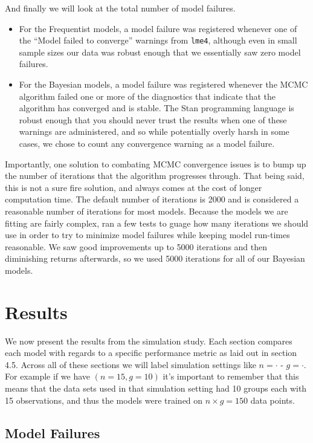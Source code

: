 \documentclass[12pt,twoside]{reedthesis}
\providecommand{\tightlist}{%
  \setlength{\itemsep}{0pt}\setlength{\parskip}{0pt}}
\begin{document}
And finally we will look at the total number of model failures.
\begin{itemize}
\tightlist
\item
  For the Frequentist models, a model failure was registered whenever one of the ``Model failed to converge'' warnings from \texttt{lme4}, although even in small sample sizes our data was robust enough that we essentially saw zero model failures.
\item
  For the Bayesian models, a model failure was registered whenever the MCMC algorithm failed one or more of the diagnostics that indicate that the algorithm has converged and is stable. The Stan programming language is robust enough that you should never trust the results when one of these warnings are administered, and so while potentially overly harsh in some cases, we chose to count any convergence warning as a model failure.
\end{itemize}
Importantly, one solution to combating MCMC convergence issues is to bump up the number of iterations that the algorithm progresses through. That being said, this is not a sure fire solution, and always comes at the cost of longer computation time. The default number of iterations is 2000 and is considered a reasonable number of iterations for most models. Because the models we are fitting are fairly complex, ran a few tests to guage how many iterations we should use in order to try to minimize model failures while keeping model run-times reasonable. We saw good improvements up to 5000 iterations and then diminishing returns afterwards, so we used 5000 iterations for all of our Bayesian models.

\hypertarget{res-sec}{%
\chapter{Results}\label{res-sec}}

We now present the results from the simulation study. Each section compares each model with regards to a specific performance metric as laid out in section 4.5. Across all of these sections we will label simulation settings like \(n = \cdot\) - \(g = \cdot\). For example if we have \((n = 15, g = 10 )\) it's important to remember that this means that the data sets used in that simulation setting had 10 groups each with 15 observations, and thus the models were trained on \(n\times g = 150\) data points.

\hypertarget{model-failures}{%
\section{Model Failures}\label{model-failures}}
\end{document}
